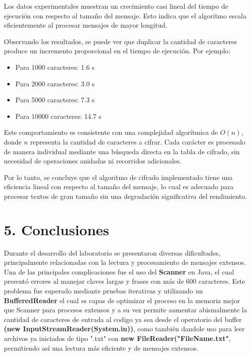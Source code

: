 \documentclass[12pt]{article}
\begin{document}
Los datos experimentales muestran un crecimiento casi lineal del tiempo de ejecución con respecto al tamaño del mensaje. Esto indica que el algoritmo escala eficientemente al procesar mensajes de mayor longitud.

Observando los resultados, se puede ver que duplicar la cantidad de caracteres produce un incremento proporcional en el tiempo de ejecución. Por ejemplo:

\begin{itemize}
    \item Para 1000 caracteres: 1.6 s
    \item Para 2000 caracteres: 3.0 s
    \item Para 5000 caracteres: 7.3 s
    \item Para 10000 caracteres: 14.7 s
\end{itemize}

Este comportamiento es consistente con una complejidad algorítmica de $O(n)$, donde $n$ representa la cantidad de caracteres a cifrar. Cada carácter es procesado de manera individual mediante una búsqueda directa en la tabla de cifrado, sin necesidad de operaciones anidadas ni recorridos adicionales.

Por lo tanto, se concluye que el algoritmo de cifrado implementado tiene una eficiencia lineal con respecto al tamaño del mensaje, lo cual es adecuado para procesar textos de gran tamaño sin una degradación significativa del rendimiento.


\section*{5. Conclusiones}

Durante el desarrollo del laboratorio se presentaron diversas dificultades, principalmente relacionadas con la lectura y procesamiento de mensajes extensos. Una de las principales complicaciones fue el uso del \textbf{Scanner} en Java, el cual presentó errores al manejar claves largas y frases con más de 600 caracteres. Este problema fue superado mediante pruebas iterativas y utilizando un \textbf{BufferedReader} el cual es capas de optimizar el proceso en la memoria mejor que Scanner para procesos extensos y a su vez permite aumentar abismalmente la cantidad de caracteres de entrada al codigo ya sea desde el operatorio del buffer \textbf{(new InputStreamReader(System.in))}, como también dandole uso para leer archivos ya iniciados de tipo ".txt" con \textbf{new FileReader("FileName.txt"}, permitiendo así una lectura más eficiente y de mensajes extensos.
\end{document}
